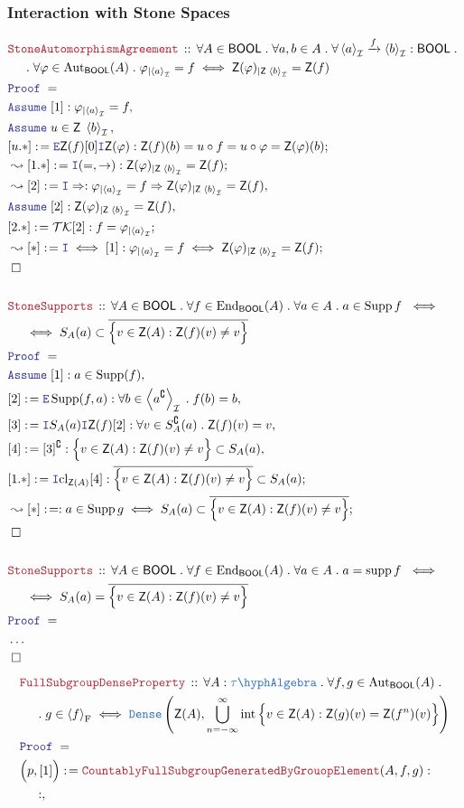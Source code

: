 \documentclass[12pt]{scrartcl}
\newcommand{\TYPE}[1]{\textcolor{NavyBlue}{\mathtt{#1}}}
\newcommand{\LOGIC}[1]{\textcolor{Blue}{\mathtt{#1}}}
\newcommand{\THM}[1]{\textcolor{Maroon}{\mathtt{#1}}}
\renewcommand{\.}{\; . \;}
\newcommand{\de}{: \kern 0.1pc =}
\newcommand{\Theorem}[2]{& \THM{#1} \, :: \, #2 \\ & \Proof = \\ }
\newcommand{\NewLine}{\\ & \kern 1pc}
\newcommand{\Page}[1]{ \begin{align*} #1 \end{align*}   }
\newcommand{\NoProof}{ & \ldots \\ \EndProof}
\newcommand{\Imply}{\Rightarrow}
\newcommand{\Intro}{\LOGIC{I}}
\newcommand{\Elim}{\LOGIC{E}}
\DeclareMathOperator*{\supp}{supp}
\newcommand{\End}{\mathrm{End}}
\newcommand{\Aut}{\mathrm{Aut}}
\newcommand{\Arrow}{\xrightarrow}
\renewcommand{\c}{\complement}
\newcommand{\Say}[3]{& #1 \de #2 : #3, \\}
\newcommand{\Conclude}[3]{& #1 \de #2 : #3; \\}
\newcommand{\Derive}[3]{& \leadsto #1 \de #2 : #3, \\}
\newcommand{\DeriveConclude}[3]{& \leadsto #1 \de #2 : #3 ; \\}
\newcommand{\Assume}[2]{& \LOGIC{Assume} \; #1 : #2, \\}
\newcommand{\AssumeIn}[2]{& \LOGIC{Assume} \; #1 \in #2, \\}
\newcommand{\QED}{\; \square}
\newcommand{\EndProof}{& \QED \\}
\newcommand{\Proof}{\LOGIC{Proof} \; }
\newcommand{\genIdeal}[1]{\left\langle #1 \right\rangle_\mathcal{I}}
\newcommand{\Dense}{\TYPE{Dense}}
\DeclareMathOperator*{\intx}{int}
\DeclareMathOperator*{\cl}{cl}
\newcommand{\TK}{\mathcal{TK}}
\newcommand{\TAlgebra}{\TYPE{\tau\hyph Algebra}}
\DeclareMathOperator{\Supp}{Supp}
\newcommand{\genFS}[1]{\left\langle #1 \right\rangle_\mathrm{F}}
\newcommand{\BOOL}{\mathsf{BOOL}}
\newcommand{\Z}{\mathsf{Z}}
\begin{document}
\subsubsection{Interaction with Stone Spaces}
\Page{
	\Theorem{StoneAutomorphismAgreement}
	{
		\forall A \in \BOOL \.
		\forall a,b \in A \.
		\forall \genIdeal{a} \Arrow{f} \genIdeal{b} : \BOOL \. \NewLine \.
		\forall \varphi \in \Aut_\BOOL(A) \.
		\varphi_{|\genIdeal{a}} = f \iff
		\Z(\varphi)_{|\Z\;\genIdeal{b}} = \Z(f)
	}
	\Assume{[1]}{\varphi_{|\genIdeal{a}} = f}	
	\AssumeIn{u}{\Z \; \genIdeal{b}}
	\Conclude{[u.*]}{
		\Elim \Z(f)
		[0]
		\Intro \Z(\varphi)	
	}
	{
		\Z(f)(b) = 
		u \circ f  =
		u \circ \varphi  =
		\Z(\varphi)(b) 
	}
	\DeriveConclude{[1.*]}{\Intro(=,\to)}{\Z(\varphi)_{|\Z \; \genIdeal{b}} = \Z(f) }
	\Derive{[2]}{\Intro \Imply}
	{
		\varphi_{|\genIdeal{a}} = f \Imply
		\Z(\varphi)_{|\Z\;\genIdeal{b}} = \Z(f)
	}
	\Assume{[2]}{\Z(\varphi)_{|\Z\;\genIdeal{b}} = \Z(f)}
	\Conclude{[2.*]}{\TK[2]}{f = \varphi_{|\genIdeal{a}}}
	\DeriveConclude{[*]}{\Intro \iff [1]}
	{
		\varphi_{|\genIdeal{a}} = f \iff
		\Z(\varphi)_{|\Z\;\genIdeal{b}} = \Z(f)
	}
	\EndProof
	\\
	\Theorem{StoneSupports}
	{
		\forall A \in \BOOL \.
		\forall f \in \End_\BOOL(A) \.
		\forall a \in A \. 
		a \in \Supp f \
		\iff \NewLine \iff
		S_A(a) \subset \overline{\Big\{v \in  \Z(A): \Z(f)(v) \neq v \Big\}}
	}
	\Assume{[1]}{a \in \Supp(f)}
	\Say{[2]}{\Elim \Supp(f,a)}{\forall b \in \genIdeal{a^\c} \. f(b) = b}
	\Say{[3]}{\Intro S_A(a) \Intro \Z(f)[2]}
	{
		\forall v \in S_A^\c(a) \. \Z(f)(v) = v
	}
	\Say{[4]}{[3]^\c}
	{
		\Big\{v \in  \Z(A): \Z(f)(v) \neq v \Big\} \subset S_A(a)
	}
	\Conclude{[1.*]}{\Intro {\cl}_{\Z(A)}[4]}
	{
		\overline{ \Big\{ v \in  \Z(A): \Z(f)(v) \neq v \Big\}} \subset S_A(a)
	}
	\DeriveConclude{[*]}{}
	{
		a \in \Supp g 
		\iff
		S_A(a) \subset \overline{\Big\{v \in  \Z(A): \Z(f)(v) \neq v \Big\}}	
	}
	\EndProof
	\\
	\Theorem{StoneSupports}
	{
		\forall A \in \BOOL \.
		\forall f \in \End_\BOOL(A) \.
		\forall a \in A \. 
		a  = \supp f \
		\iff \NewLine \iff
		S_A(a) = \overline{\Big\{v \in  \Z(A): \Z(f)(v) \neq v \Big\}}
	}
	\NoProof
}\Page{
	\Theorem{FullSubgroupDenseProperty}
	{
		\forall A : \TAlgebra \.
		\forall f,g \in \Aut_\BOOL(A) \. \NewLine \.
		g \in \genFS{f} \iff 
		\Dense\left( 
			\Z(A) , \bigcup_{n = -\infty}^\infty \intx  
			\Big\{ 
				v \in \Z(A) :
			    \Z(g)(v) = \Z(f^n)(v)   
			\Big\}  
		\right)
	}
	\Say{\Big(p,[1]\Big)}
	{\THM{CountablyFullSubgroupGeneratedByGrouopElement}(A,f,g)}
	{
		\NewLine :		
}}
\end{document}
